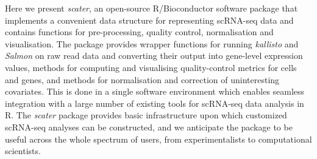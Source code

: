 \documentclass{bioinfo}
\begin{document}
Here we present \emph{scater}, an open-source R/Bioconductor software package that implements a convenient data structure for representing scRNA-seq data and contains functions for pre-processing, quality control, normalisation and visualisation. The package provides wrapper functions for running \emph{kallisto} and \emph{Salmon} on raw read data and converting their output into gene-level expression values, methods for computing and visualising quality-control metrics for cells and genes, and methods for normalisation and correction of uninteresting covariates. This is done in a single software environment which enables seamless integration with a large number of existing tools for scRNA-seq data analysis in R. The \emph{scater} package provides basic infrastructure upon which customized scRNA-seq analyses can be constructed, and we anticipate the package to be useful across the whole spectrum of users, from experimentalists to computational scientists.\vspace*{-12pt}
\end{document}
